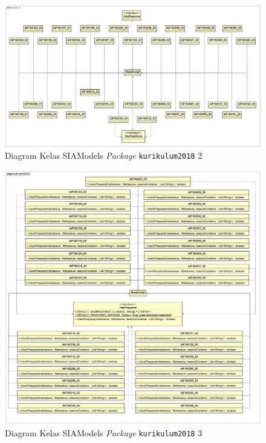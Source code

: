 \begin{figure}[H]
\centering
\includegraphics[scale=0.4]{Gambar/class-diagram-siamodels-mk-kurikulum-2018-1}
\caption{Diagram Kelas SIAModels \textit{Package} \texttt{kurikulum2018} 2}
\label{fig:siamodels_class_2018_kurikulum_2}
\end{figure}

\begin{figure}[H]
\centering
\includegraphics[scale=0.15]{Gambar/class-diagram-siamodels-mk-kurikulum-2018-3}
\caption{Diagram Kelas SIAModels \textit{Package} \texttt{kurikulum2018} 3}
\label{fig:siamodels_class_2018_kurikulum_3}
\end{figure}

